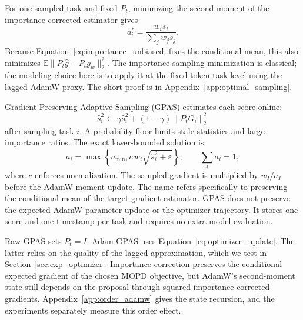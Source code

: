 For one sampled task and fixed $P_t$, minimizing the second moment of the
importance-corrected estimator gives
\begin{equation}
    a_i^*
    =
    \frac{w_i s_i}{\sum_jw_js_j}.
    \label{eq:optimal_sampling}
\end{equation}
Because Equation~\ref{eq:importance_unbiased} fixes the conditional mean,
this also minimizes
$\mathbb E\|P_t\widehat g-P_tg_w\|_2^2$. The importance-sampling
minimization is classical; the modeling choice here is to apply it at the
fixed-token task level using the lagged AdamW proxy. The short proof is
in Appendix~\ref{app:optimal_sampling}.

Gradient-Preserving Adaptive Sampling (GPAS) estimates each score online:
\begin{equation}
    \widehat s_i^2
    \leftarrow
    \gamma\widehat s_i^2
    +(1-\gamma)\|P_tG_i\|_2^2
    \label{eq:gpas_ema}
\end{equation}
after sampling task $i$. A probability floor limits stale statistics and
large importance ratios. The exact lower-bounded solution is
\begin{equation}
    a_i
    =\max\left\{a_{\min},
    c\,w_i\sqrt{\widehat s_i^2+\varepsilon}\right\},
    \qquad \sum_i a_i=1,
    \label{eq:gpas_distribution}
\end{equation}
where $c$ enforces normalization. The sampled gradient is multiplied by
$w_I/a_I$ before the AdamW moment update. The name refers specifically to
preserving the conditional mean of the target gradient estimator. GPAS does
not preserve the expected AdamW parameter update or the optimizer trajectory.
It stores one score and one timestamp per task and requires no extra model
evaluation.

Raw GPAS sets $P_t=I$. Adam GPAS uses Equation~\ref{eq:optimizer_update}.
The latter relies on the quality of the lagged approximation, which we test
in Section~\ref{sec:exp_optimizer}. Importance correction preserves the
conditional expected gradient of the chosen MOPD objective, but AdamW's
second-moment state still depends on the proposal through squared
importance-corrected gradients. Appendix~\ref{app:order_adamw} gives the
state recursion, and the experiments separately measure this order effect.
